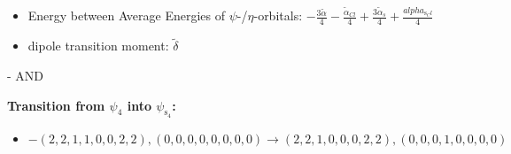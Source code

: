 \documentclass[12pt,a4paper]{article}
\begin{document}
\begin{itemize}
                \item Energy between Average Energies of $\psi$-/$\eta$-orbitals: $- \frac{3 \tilde{\alpha}}{4} - \frac{\tilde{\alpha}_{Cl}}{4} + \frac{3 \tilde{\alpha}_{s}}{4} + \frac{alpha_{\text{s}_Cl}}{4}$
            
            \item dipole transition moment: $\tilde{\delta}$
        
        \end{itemize}
        
 -  AND 

        \noindent\textbf{Transition from $\psi_{4}$ into $\psi_{\text{s}_{4}}$:}
        \begin{itemize}
            \item $- (2, 2, 1, 1, 0, 0, 2, 2), (0, 0, 0, 0, 0, 0, 0, 0) \rightarrow (2, 2, 1, 0, 0, 0, 2, 2), (0, 0, 0, 1, 0, 0, 0, 0)$
        

\end{itemize}
\end{document}

